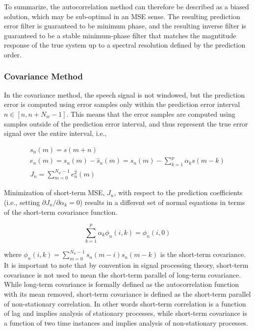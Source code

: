 To summarize, the autocorrelation method can therefore be described as a biased solution, which may be sub-optimal in an MSE sense. The resulting prediction error filter is guaranteed to be minimum phase, and the resulting inverse filter is guaranteed to be a stable minimum-phase filter that matches the magntitude response of the true system up to a spectral resolution defined by the prediction order.


\subsubsection{Covariance Method} \label{lp_cov}

In the covariance method, the speech signal is not windowed, but the prediction error is computed using error samples only within the prediction error interval $n \in [n, n+N_w-1]$. This means that the error samples are computed using samples outside of the prediction error interval, and thus represent the true error signal over the entire interval, i.e.,

\begin{eqnarray}
	s_n(m) = s(m+n) \\
	e_n(m) = s_n(m) - \hat{s}_n(m) = s_n(m) - \sum_{k=1}^{p} \alpha_k s(m-k) \\
	J_n = \sum_{m=0}^{N_w-1} e_n^2(m) \label{eq:cov_tse}
\end{eqnarray}

 Minimization of short-term MSE, $J_n$, with respect to the prediction coefficients (i.e., setting $\partial J_n/\partial \alpha_k=0$) results in a different set of normal equations in terms of the short-term covariance function. 
 
 \begin{equation}
 	\sum_{k=1}^{p} \alpha_k \phi_n(i,k) = \phi_n(i,0)
 \end{equation}
 
 \noindent
 where $\phi_n(i,k) = \sum_{m=0}^{N_w-1} s_n(m-i) s_n(m-k)$ is the short-term covariance. It is important to note that by convention in signal processing theory, short-term covariance is not used to mean the short-term parallel of long-term covariance. While long-term covariance is formally defined as the autocorrelation function with its mean removed, short-term covariance is defined as the short-term parallel of non-stationary correlation. In other words short-term correlation is a function of lag and implies analysis of stationary processes, while short-term covariance is a function of two time instances and implies analysis of non-stationary processes.
 
